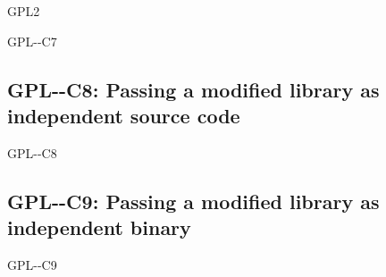 \begin{license}{GPL2}
\begin{lsuc}{GPL-\ver-C7}
  \lsucprohibitsnothing
\end{lsuc}

\subsection{GPL-\ver-C8: Passing a modified library as independent source code}
\begin{lsuc}{GPL-\ver-C8}

  \useCaseEight

  \begin{lsucrequires}
    \lsucmandatory{\keepLicenseElements}
    \lsucmandatory{\gpltwoEnsureCopyrightNoticeSource}
    \lsucmandatory{\giveLicense}\passingFilesCorrectly
    \lsucmandatory{\retainCopyrightNotices}
    \lsucmandatory{\markLibraryModifications}
    \lsucmandatory{\arrangeLibraryChanges}\howToApplyTheseTerms
    \lsucoptional{\createChangelog}
    \lsucoptional{\addToDocumentation}
  \end{lsucrequires}

  \lsucprohibitsnothing
\end{lsuc}

\subsection{GPL-\ver-C9: Passing a modified library as independent binary}
\begin{lsuc}{GPL-\ver-C9}

  \useCaseNine

  \begin{lsucrequires}
    \lsucmandatory{\keepLicenseElements}
    \lsucmandatory{\gpltwoEnsureCopyrightNoticeSource}  
    \lsucmandatory{\giveLicense}\passingFilesCorrectly
    \lsucmandatory{\retainCopyrightNotices}
    \lsucmandatory{\makeModifiedSourceAvailable}
    \lsucmandatory{\describeHowToGetSource}
    \lsucmandatory{\markLibraryModifications}
    \lsucmandatory{\arrangeLibraryChanges}\howToApplyTheseTerms
    \lsucoptional{\createChangelog}
    \lsucoptional{\addToDocumentation}
  \end{lsucrequires}

  \lsucprohibitsnothing
\end{lsuc}


\end{license}
